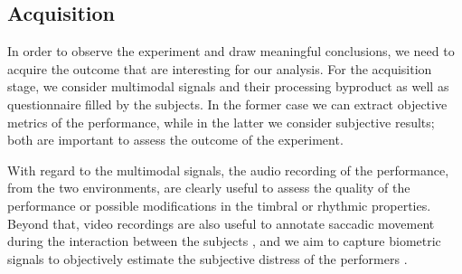 \subsection{Acquisition}
In order to observe the experiment and draw meaningful conclusions, we need to acquire the outcome that are interesting for our analysis. For the acquisition stage, we consider multimodal signals and their processing byproduct as well as questionnaire filled by the subjects. In the former case we can extract objective metrics of the performance, while in the latter we consider subjective results; both are important to assess the outcome of the experiment. 

With regard to the multimodal signals, the audio recording of the performance, from the two environments, are clearly useful to assess the quality of the performance or possible modifications in the timbral or rhythmic properties. Beyond that, video recordings are also useful to annotate saccadic movement during the interaction between the subjects \cite{vandemoortele2018gazing}, and we aim to capture biometric signals to objectively estimate the subjective distress of the performers \cite{Yoshie2009}. 
